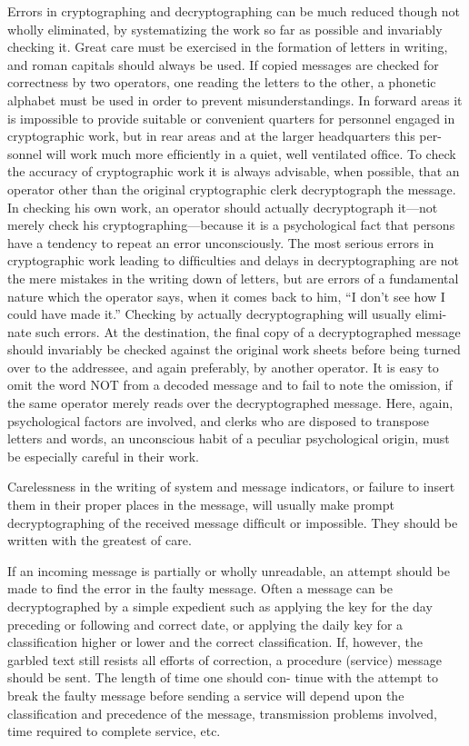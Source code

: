 \mypara Errors in cryptographing and decryptographing can be much
reduced though not wholly eliminated, by systematizing the work so far
as possible and invariably checking it. Great care must be exercised in
the formation of letters in writing, and roman capitals should always be
used. If copied messages are checked for correctness by two operators,
one reading the letters to the other, a phonetic alphabet must be used in
order to prevent misunderstandings. In forward areas it is impossible to
provide suitable or convenient quarters for personnel engaged in cryptographic work, but in rear areas and at the larger headquarters this per-
sonnel will work much more efﬁciently in a quiet, well ventilated ofﬁce.
To check the accuracy of cryptographic work it is always advisable, when
possible, that an operator other than the original cryptographic clerk
decryptograph the message. In checking his own work, an operator should
actually decryptograph it—not merely check his cryptographing—because
it is a psychological fact that persons have a tendency to repeat an error
unconsciously. The most serious errors in cryptographic work leading to
difﬁculties and delays in decryptographing are not the mere mistakes in
the writing down of letters, but are errors of a fundamental nature which
the operator says, when it comes back to him, “I don’t see how I could
have made it.” Checking by actually decryptographing will usually elimi-
nate such errors. At the destination, the ﬁnal copy of a decryptographed
message should invariably be checked against the original work sheets
before being turned over to the addressee, and again preferably, by
another operator. It is easy to omit the word NOT from a decoded
message and to fail to note the omission, if the same operator merely
reads over the decryptographed message. Here, again, psychological
factors are involved, and clerks who are disposed to transpose letters and
words, an unconscious habit of a peculiar psychological origin, must be
especially careful in their work.

\mypara Carelessness in the writing of system and message indicators, or
failure to insert them in their proper places in the message, will usually
make prompt decryptographing of the received message difﬁcult or
impossible. They should be written with the greatest of care.

\mypara If an incoming message is partially or wholly unreadable, an attempt
should be made to ﬁnd the error in the faulty message. Often a message
can be decryptographed by a simple expedient such as applying the key
for the day preceding or following and correct date, or applying the daily
key for a classiﬁcation higher or lower and the correct classiﬁcation. If,
however, the garbled text still resists all efforts of correction, a procedure
(service) message should be sent. The length of time one should con-
tinue with the attempt to break the faulty message before sending a
service will depend upon the classiﬁcation and precedence of the message,
transmission problems involved, time required to complete service, etc.

